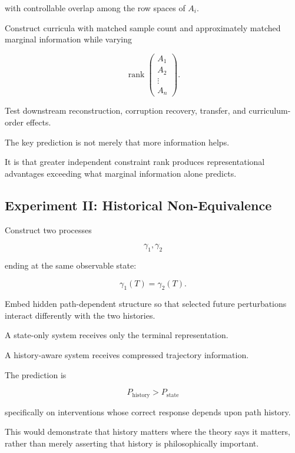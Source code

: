 \documentclass[11pt]{article}
\theoremstyle{remark}
\begin{document}
with controllable overlap among the row spaces of $A_i$.

Construct curricula with matched sample count and approximately matched marginal information while varying

\begin{equation}
\operatorname{rank}
\begin{pmatrix}
A_1\\
A_2\\
\vdots\\
A_n
\end{pmatrix}.
\end{equation}

Test downstream reconstruction, corruption recovery, transfer, and curriculum-order effects.

The key prediction is not merely that more information helps.

It is that greater independent constraint rank produces representational advantages exceeding what marginal information alone predicts.

\subsection{Experiment II: Historical Non-Equivalence}

Construct two processes

\begin{equation}
\gamma_1,
\gamma_2
\end{equation}

ending at the same observable state:

\begin{equation}
\gamma_1(T)
=
\gamma_2(T).
\end{equation}

Embed hidden path-dependent structure so that selected future perturbations interact differently with the two histories.

A state-only system receives only the terminal representation.

A history-aware system receives compressed trajectory information.

The prediction is

\begin{equation}
P_{\mathrm{history}}
>
P_{\mathrm{state}}
\end{equation}

specifically on interventions whose correct response depends upon path history.

This would demonstrate that history matters where the theory says it matters, rather than merely asserting that history is philosophically important.
\end{document}

